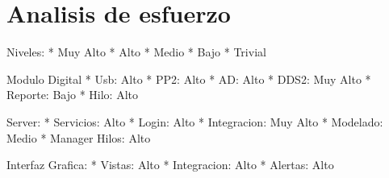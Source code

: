 \section{Analisis de esfuerzo}

Niveles:
    * Muy Alto
    * Alto
    * Medio
    * Bajo
    * Trivial

Modulo Digital
    * Usb: Alto
    * PP2: Alto
    * AD: Alto
    * DDS2: Muy Alto
    * Reporte: Bajo
    * Hilo: Alto

Server:
    * Servicios: Alto
    * Login: Alto
    * Integracion: Muy Alto
    * Modelado: Medio
    * Manager Hilos: Alto

Interfaz Grafica:
    * Vistas: Alto
    * Integracion: Alto
    * Alertas: Alto

\newpage